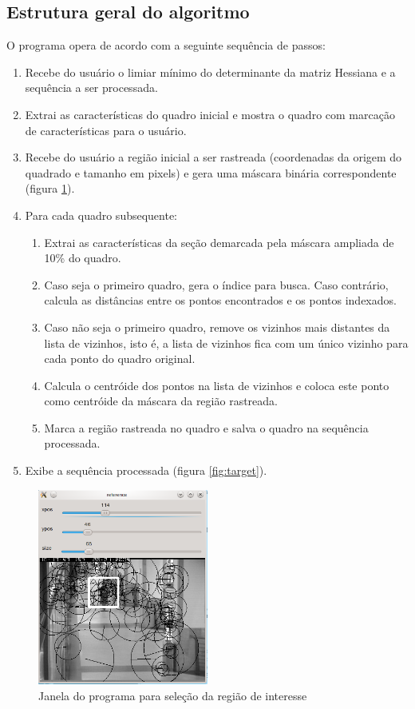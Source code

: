 \documentclass[a4paper]{coursepaper-br}
\begin{document}
\subsection{Estrutura geral do algoritmo}

O programa opera de acordo com a seguinte sequência de passos:

\begin{enumerate}
 \item Recebe do usuário o limiar mínimo do determinante da matriz
   Hessiana e a sequência a ser processada.
 \item Extrai as características do quadro inicial e mostra o quadro com
   marcação de características para o usuário.
 \item Recebe do usuário a região inicial a ser rastreada (coordenadas
   da origem do quadrado e tamanho em pixels) e gera uma máscara
   binária correspondente (figura \ref{fig:reference}).
 \item Para cada quadro subsequente:
\begin{enumerate}
 \item Extrai as características da seção demarcada pela máscara
   ampliada de 10\% do quadro.
 \item Caso seja o primeiro quadro, gera o índice para busca. Caso
   contrário, calcula as distâncias entre os pontos encontrados e os
   pontos indexados.
 \item Caso não seja o primeiro quadro, remove os vizinhos mais
   distantes da lista de vizinhos, isto é, a lista de vizinhos fica
   com um único vizinho para cada ponto do quadro original.
 \item Calcula o centróide dos pontos na lista de vizinhos e coloca
   este ponto como centróide da máscara da região rastreada.
 \item Marca a região rastreada no quadro e salva o quadro na
   sequência processada.
\end{enumerate}
 \item Exibe a sequência processada (figura \ref{fig:target}).
\end{enumerate}

\begin{figure}
\centering
\includegraphics[width=0.5\textwidth]{reference.png}
\caption{Janela do programa para seleção da região de interesse}
\label{fig:reference}
\end{figure}
\end{document}
